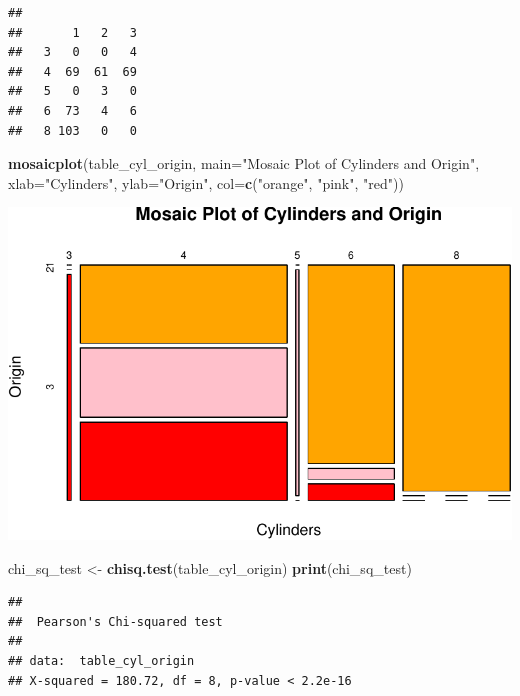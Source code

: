\documentclass[
]{article}
\newenvironment{Shaded}{\begin{snugshade}}{\end{snugshade}}
\newcommand{\AttributeTok}[1]{\textcolor[rgb]{0.13,0.29,0.53}{#1}}
\newcommand{\FunctionTok}[1]{\textcolor[rgb]{0.13,0.29,0.53}{\textbf{#1}}}
\newcommand{\NormalTok}[1]{#1}
\newcommand{\OtherTok}[1]{\textcolor[rgb]{0.56,0.35,0.01}{#1}}
\newcommand{\SpecialCharTok}[1]{\textcolor[rgb]{0.81,0.36,0.00}{\textbf{#1}}}
\newcommand{\StringTok}[1]{\textcolor[rgb]{0.31,0.60,0.02}{#1}}
\begin{document}
\begin{Shaded}
\end{Shaded}

\begin{verbatim}
##    
##       1   2   3
##   3   0   0   4
##   4  69  61  69
##   5   0   3   0
##   6  73   4   6
##   8 103   0   0
\end{verbatim}

\begin{Shaded}
\begin{Highlighting}[]
\FunctionTok{mosaicplot}\NormalTok{(table\_cyl\_origin, }\AttributeTok{main=}\StringTok{"Mosaic Plot of Cylinders and Origin"}\NormalTok{, }\AttributeTok{xlab=}\StringTok{"Cylinders"}\NormalTok{, }\AttributeTok{ylab=}\StringTok{"Origin"}\NormalTok{, }\AttributeTok{col=}\FunctionTok{c}\NormalTok{(}\StringTok{"orange"}\NormalTok{, }\StringTok{"pink"}\NormalTok{, }\StringTok{"red"}\NormalTok{))}
\end{Highlighting}
\end{Shaded}

\includegraphics{QuestionCar_files/figure-latex/unnamed-chunk-3-1.pdf}

\begin{Shaded}
\begin{Highlighting}[]
\NormalTok{chi\_sq\_test }\OtherTok{\textless{}{-}} \FunctionTok{chisq.test}\NormalTok{(table\_cyl\_origin)}
\FunctionTok{print}\NormalTok{(chi\_sq\_test)}
\end{Highlighting}
\end{Shaded}

\begin{verbatim}
## 
##  Pearson's Chi-squared test
## 
## data:  table_cyl_origin
## X-squared = 180.72, df = 8, p-value < 2.2e-16
\end{verbatim}
\end{document}
